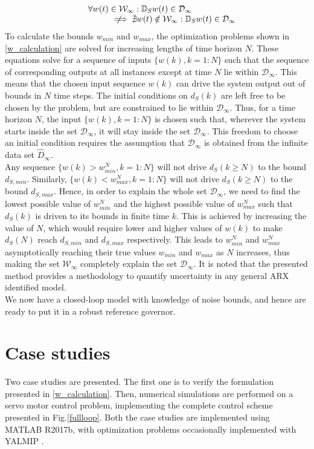 \documentclass[letterpaper, 10 pt, conference]{ieeeconf}  %
\newcommand{\notimplies}{%
	\mathrel{{\ooalign{\hidewidth$\not\phantom{=}$\hidewidth\cr$\implies$}}}}
\begin{document}
\begin{enumerate}
\begin{equation*}
\begin{matrix}
	\hspace{-40pt}\forall w(t) \in \mathcal{W}_{\infty}  : \mathbb{D}_S w(t) \in \mathcal{D}_{\infty} \\
	\hspace{40pt}\notimplies \nexists  w(t) \notin \mathcal{W}_{\infty} : \mathbb{D}_S w(t) \in \mathcal{D}_{\infty}
	\end{matrix}
	\end{equation*}
	To calculate the bounds $w_{min}$ and $w_{max}$, the optimization problems shown in \ref{w_calculation} are solved for increasing lengths of time horizon $N$.
	These equations solve for a sequence of inputs $\{w(k), k={1:N}\}$ such that the sequence of corresponding outputs at all instances except at time $N$ lie within $\mathcal{D}_{\infty}$. This means that the chosen input sequence $w(k)$ can drive the system output out of bounds in $N$ time steps. The initial conditions on $d_S(k)$ are left free to be chosen by the problem, but are constrained to lie within $\mathcal{D}_{\infty}$. Thus, for a time horizon $N$, the input $\{w(k), k={1:N}\}$ is chosen such that, wherever the system starts inside the set $\mathcal{D}_{\infty}$, it will stay inside the set $\mathcal{D}_{\infty}$. This freedom to choose an initial condition requires the assumption that $\mathcal{D}_{\infty}$ is obtained from the infinite data set $\hat{D}_{\infty}$.
	\\
	Any sequence $\{w(k)>w^N_{min},k=1:N\}$ will not drive $d_S(k \geq N)$ to the bound $d_{S,min}$. Similarly, $\{w(k)<w^N_{max},k=1:N\}$ will not drive $d_S(k \geq N)$ to the bound $d_{S,max}$. Hence, in order to explain the whole set $\mathcal{D}_{\infty}$, we need to find the lowest possible value of $w^N_{min}$ and the highest possible value of $w^N_{max}$ such that $d_S(k)$ is driven to its bounds in finite time $k$. This is achieved by increasing the value of $N$, which would require lower and higher values of $w(k)$ to make $d_S(N)$ reach $d_{S,min}$ and $d_{S,max}$ respectively. This leads to $w^N_{min}$ and $w^N_{max}$ asymptotically reaching their true values $w_{min}$ and $w_{max}$ as $N$ increases, thus making the set $\mathcal{W}_{\infty}$ completely explain the set $\mathcal{D}_{\infty}$. It is noted that the presented method provides a methodology to quantify uncertainty in any general ARX identified model.
	\\
	We now have a closed-loop model with knowledge of noise bounds, and hence are ready to put it in a robust reference governor.
	\section{Case studies}
	Two case studies are presented. The first one is to verify the formulation presented in \eqref{w_calculation}. Then, numerical simulations are performed on a servo motor control problem, implementing the complete control scheme presented in Fig.\ref{fullloop}. Both the case studies are implemented using MATLAB R2017b, with optimization problems occasionally implemented with YALMIP \cite{Lofberg2004}.
	\label{Case studies}

\end{enumerate}
\end{document}
